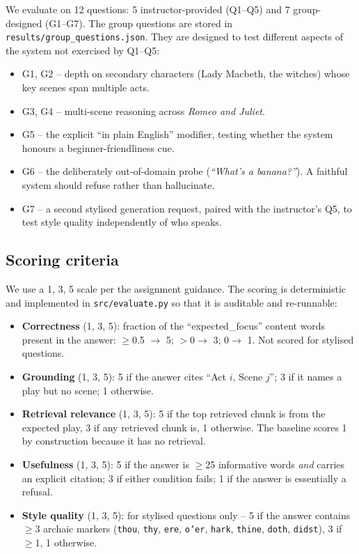 \documentclass[10pt,twocolumn,a4paper]{article}
\begin{document}
We evaluate on 12 questions: 5 instructor-provided (Q1--Q5) and 7
group-designed (G1--G7). The group questions are stored in
\verb|results/group_questions.json|. They are designed to test
different aspects of the system not exercised by Q1--Q5:

\begin{itemize}
    \item G1, G2 -- depth on secondary characters
        (Lady Macbeth, the witches) whose key scenes span multiple
        acts.
    \item G3, G4 -- multi-scene reasoning across \emph{Romeo and
        Juliet}.
    \item G5 -- the explicit ``in plain English'' modifier, testing
        whether the system honours a beginner-friendliness cue.
    \item G6 -- the deliberately out-of-domain probe
        (\emph{``What's a banana?''}). A faithful system should refuse
        rather than hallucinate.
    \item G7 -- a second stylised generation request, paired with the
        instructor's Q5, to test style quality independently of who
        speaks.
\end{itemize}

\subsection{Scoring criteria}

We use a 1, 3, 5 scale per the assignment guidance. The scoring is
deterministic and implemented in \verb|src/evaluate.py| so that it is
auditable and re-runnable:

\begin{itemize}
    \item \textbf{Correctness} (1, 3, 5): fraction of the
        ``expected\_focus'' content words present in the answer:
        $\geq$0.5 $\to$ 5; $>0 \to$ 3; $0 \to$ 1.
        Not scored for stylised questions.
    \item \textbf{Grounding} (1, 3, 5): 5 if the answer cites
        ``Act $i$, Scene $j$''; 3 if it names a play but no scene;
        1 otherwise.
    \item \textbf{Retrieval relevance} (1, 3, 5): 5 if the top
        retrieved chunk is from the expected play, 3 if any retrieved
        chunk is, 1 otherwise. The baseline scores 1 by construction
        because it has no retrieval.
    \item \textbf{Usefulness} (1, 3, 5): 5 if the answer is
        $\geq$25 informative words \emph{and} carries an explicit
        citation; 3 if either condition fails; 1 if the answer is
        essentially a refusal.
    \item \textbf{Style quality} (1, 3, 5): for stylised questions
        only -- 5 if the answer contains $\geq$3 archaic markers
        (\texttt{thou}, \texttt{thy}, \texttt{ere}, \texttt{o'er},
        \texttt{hark}, \texttt{thine}, \texttt{doth}, \texttt{didst}),
        3 if $\geq$1, 1 otherwise.
\end{itemize}
\end{document}
